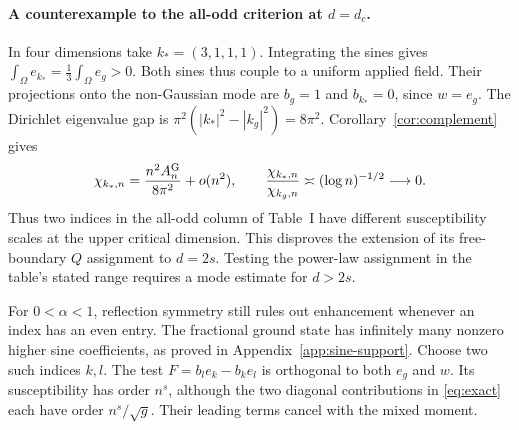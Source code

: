 \documentclass[11pt]{article}
\numberwithin{equation}{section}
\begin{document}
\paragraph{A counterexample to the all-odd criterion at $d=d_c$.}
In four dimensions take $k_*=(3,1,1,1)$. Integrating the sines gives
$\int_\Omega e_{k_*}=\tfrac13\int_\Omega e_g>0$.
Both sines thus couple to a uniform applied field. Their projections
onto the non-Gaussian mode are $b_g=1$ and $b_{k_*}=0$, since $w=e_g$.
The Dirichlet eigenvalue gap is
$\pi^2(|k_*|^2-|k_g|^2)=8\pi^2$. Corollary~\ref{cor:complement} gives
\begin{equation}
 \chi_{k_*,n}=\frac{n^2 A_n^{\rm G}}{8\pi^2}+o(n^2),
 \qquad
 \frac{\chi_{k_*,n}}{\chi_{k_g,n}}\asymp(\log n)^{-1/2}
 \longrightarrow 0 .
 \label{eq:odd-pair}
\end{equation}
Thus two indices in the all-odd column of Table~I have different
susceptibility scales at the upper critical dimension. This disproves
the extension of its free-boundary $Q$ assignment to $d=2s$.
Testing the power-law assignment in the table's stated range requires
a mode estimate for $d>2s$.

For $0<\alpha<1$, reflection symmetry still rules out enhancement
whenever an index has an even entry. The fractional ground state has infinitely many
nonzero higher sine coefficients, as proved in
Appendix~\ref{app:sine-support}. Choose two such indices $k,l$.
The test $F=b_l e_k-b_k e_l$ is orthogonal to both $e_g$ and $w$.
Its susceptibility has order $n^s$, although the two diagonal
contributions in \eqref{eq:exact} each have order $n^s/\sqrt g$.
Their leading terms cancel with the mixed moment.
\end{document}
